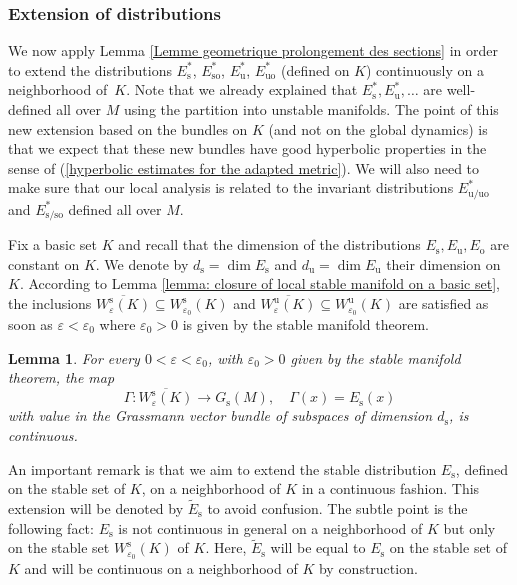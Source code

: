 \documentclass[11pt]{article}
\newcommand{\ro}{\mathrm{o}}
\newcommand{\rs}{\mathrm{s}}
\newcommand{\rso}{\mathrm{so}}
\newcommand{\ru}{\mathrm{u}}
\newcommand{\ruo}{\mathrm{uo}}
\theoremstyle{definition}
\theoremstyle{plain}
\newtheorem{lemma}[definition]{Lemma}
\begin{document}
\subsubsection{Extension of distributions} We now apply Lemma \ref{Lemme geometrique prolongement des sections} in order to extend the distributions $E_{\rs}^*$, $E_{\rso}^*$, $E_{\ru}^*$, $E_{\ruo}^*$ (defined on $K$) continuously on a neighborhood of~$K$. Note that we already explained that $E_\rs^*, E_\ru^*,\dots$ are well-defined all over $M$ using the partition into unstable manifolds. The point of this new extension based on the bundles on $K$ (and not on the global dynamics) is that we expect that these new bundles have good hyperbolic properties in the sense of (\ref{hyperbolic estimates for the adapted metric}). We will also need to make sure that our local analysis is related to the invariant distributions $E_{\ru/\ruo}^*$ and $E_{\rs/\rso}^*$ defined all over $M$.

Fix a basic set $K$ and recall that the dimension of the distributions $E_\rs, E_\ru, E_\ro$ are constant on $K$. We denote by $d_{\rs} = \dim E_\rs$ and $d_{\ru} = \dim E_\ru$ their dimension on $K$. According to Lemma \ref{lemma: closure of local stable manifold on a basic set}, the inclusions $\overline{W_{\varepsilon}^\rs (K)} \subseteq W_{\varepsilon_0}^\rs (K)$ and $\overline{W_{\varepsilon}^\ru (K)} \subseteq W_{\varepsilon_0}^\ru (K)$ are satisfied as soon as $\varepsilon < \varepsilon_0$ where $\varepsilon_0 > 0$ is given by the stable manifold theorem.

\begin{lemma}\label{lemma: continuity of extension of distributions}For every $0 < \varepsilon < \varepsilon_0$, with $\varepsilon_0 > 0$ given by the stable manifold theorem, the map
\[
\Gamma: \overline{W_{\varepsilon}^{\rs} (K)} \to G_{\rs}(M), \quad \Gamma(x) = E_\rs (x)
\]
with value in the Grassmann vector bundle of subspaces of dimension $d_{\rs}$, is continuous.
\end{lemma}

An important remark is that we aim to extend the stable distribution $E_\rs$, defined on the stable set of $K$, on a neighborhood of $K$ in a continuous fashion. This extension will be denoted by $\widetilde{E}_\rs$ to avoid confusion. The subtle point is the following fact: $E_\rs$ is not continuous in general on a neighborhood of $K$ but only on the stable set $W_{\varepsilon_0}^\rs (K)$ of $K$. Here, $\widetilde{E}_\rs$ will be equal to $E_\rs$ on the stable set of $K$ and will be continuous on a neighborhood of $K$ by construction.
\end{document}
